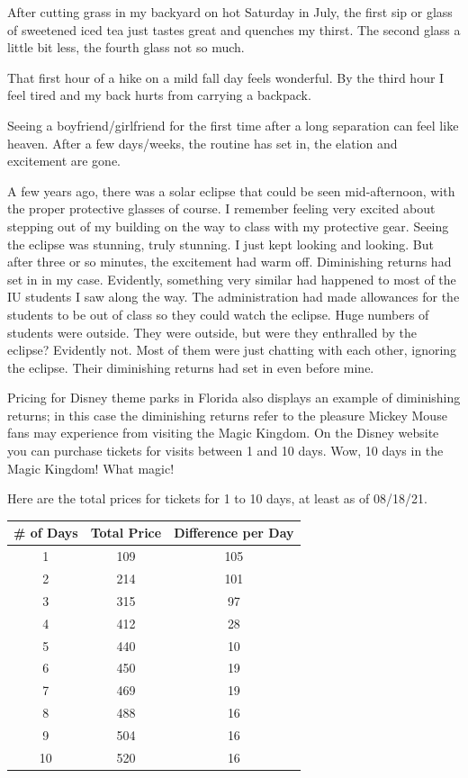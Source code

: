 \documentclass[
]{book}
\begin{document}
After cutting grass in my backyard on hot Saturday in July, the first sip or glass of sweetened iced tea just tastes great and quenches my thirst. The second glass a little bit less, the fourth glass not so much.

That first hour of a hike on a mild fall day feels wonderful. By the third hour I feel tired and my back hurts from carrying a backpack.

Seeing a boyfriend/girlfriend for the first time after a long separation can feel like heaven. After a few days/weeks, the routine has set in, the elation and excitement are gone.

A few years ago, there was a solar eclipse that could be seen mid-afternoon, with the proper protective glasses of course. I remember feeling very excited about stepping out of my building on the way to class with my protective gear. Seeing the eclipse was stunning, truly stunning. I just kept looking and looking. But after three or so minutes, the excitement had warm off. Diminishing returns had set in in my case. Evidently, something very similar had happened to most of the IU students I saw along the way. The administration had made allowances for the students to be out of class so they could watch the eclipse. Huge numbers of students were outside. They were outside, but were they enthralled by the eclipse? Evidently not. Most of them were just chatting with each other, ignoring the eclipse. Their diminishing returns had set in even before mine.

Pricing for Disney theme parks in Florida also displays an example of diminishing returns; in this case the diminishing returns refer to the pleasure Mickey Mouse fans may experience from visiting the Magic Kingdom. On the Disney website you can purchase tickets for visits between 1 and 10 days. Wow, 10 days in the Magic Kingdom! What magic!

Here are the total prices for tickets for 1 to 10 days, at least as of 08/18/21.

\begin{longtable}[]{@{}ccc@{}}
\toprule
\# of Days & Total Price & Difference per Day \\
\midrule
\endhead
1 & 109 & 105 \\
2 & 214 & 101 \\
3 & 315 & 97 \\
4 & 412 & 28 \\
5 & 440 & 10 \\
6 & 450 & 19 \\
7 & 469 & 19 \\
8 & 488 & 16 \\
9 & 504 & 16 \\
10 & 520 & 16 \\
\bottomrule
\end{longtable}
\end{document}
